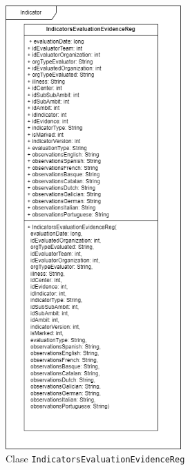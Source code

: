 \begin{itemize}
    \begin{figure}[H]
        \centering
        \includegraphics[width=0.6\textwidth]{./Figuras/Diagramas/IndicatorsEvaluationEvidenceReg.png}
        \caption{Clase \texttt{IndicatorsEvaluationEvidenceReg}}\label{fig:./Figuras/Diagramas/IndicatorsEvaluationEvidenceReg.png}
    \end{figure}


\end{itemize}
